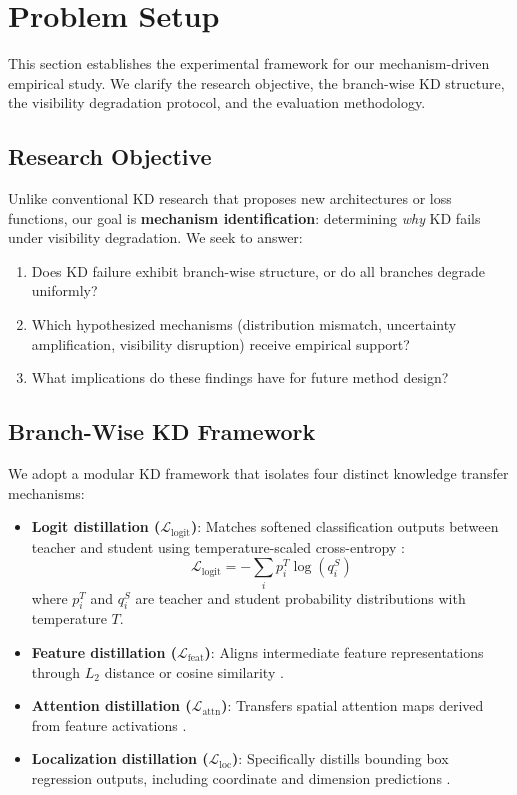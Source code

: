\section{Problem Setup}
\label{sec:setup}

This section establishes the experimental framework for our mechanism-driven empirical study. We clarify the research objective, the branch-wise KD structure, the visibility degradation protocol, and the evaluation methodology.

\subsection{Research Objective}

Unlike conventional KD research that proposes new architectures or loss functions, our goal is \textbf{mechanism identification}: determining \emph{why} KD fails under visibility degradation. We seek to answer:
\begin{enumerate}
    \item Does KD failure exhibit branch-wise structure, or do all branches degrade uniformly?
    \item Which hypothesized mechanisms (distribution mismatch, uncertainty amplification, visibility disruption) receive empirical support?
    \item What implications do these findings have for future method design?
\end{enumerate}

\subsection{Branch-Wise KD Framework}

We adopt a modular KD framework that isolates four distinct knowledge transfer mechanisms:

\begin{itemize}
    \item \textbf{Logit distillation ($\mathcal{L}_{\text{logit}}$)}: Matches softened classification outputs between teacher and student using temperature-scaled cross-entropy \cite{hinton2015distilling}:
    \begin{equation}
    \mathcal{L}_{\text{logit}} = -\sum_{i} p_i^T \log(q_i^S)
    \end{equation}
    where $p_i^T$ and $q_i^S$ are teacher and student probability distributions with temperature $T$.

    \item \textbf{Feature distillation ($\mathcal{L}_{\text{feat}}$)}: Aligns intermediate feature representations through $L_2$ distance or cosine similarity \cite{romero2014fitnets}.

    \item \textbf{Attention distillation ($\mathcal{L}_{\text{attn}}$)}: Transfers spatial attention maps derived from feature activations \cite{zagoruyko2016paying}.

    \item \textbf{Localization distillation ($\mathcal{L}_{\text{loc}}$)}: Specifically distills bounding box regression outputs, including coordinate and dimension predictions \cite{dai2021general}.
\end{itemize}

